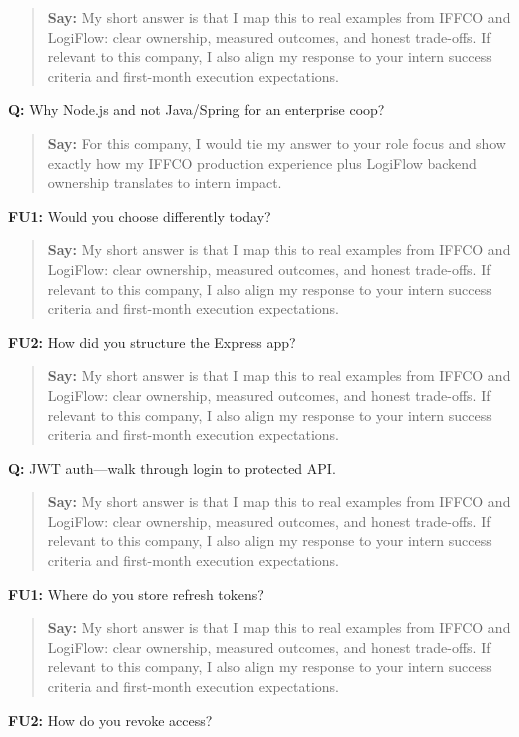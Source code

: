 \documentclass[9pt,a4paper]{article}
\begin{document}
\begin{quote}\small\textbf{Say:} My short answer is that I map this to real examples from IFFCO and LogiFlow: clear ownership, measured outcomes, and honest trade-offs. If relevant to this company, I also align my response to your intern success criteria and first-month execution expectations.\end{quote}
\vspace{2mm}
\textbf{Q:} Why Node.js and not Java/Spring for an enterprise coop?

\begin{quote}\small\textbf{Say:} For this company, I would tie my answer to your role focus and show exactly how my IFFCO production experience plus LogiFlow backend ownership translates to intern impact.\end{quote}
\vspace{2mm}
\textbf{FU1:} Would you choose differently today?

\begin{quote}\small\textbf{Say:} My short answer is that I map this to real examples from IFFCO and LogiFlow: clear ownership, measured outcomes, and honest trade-offs. If relevant to this company, I also align my response to your intern success criteria and first-month execution expectations.\end{quote}
\vspace{2mm}
\textbf{FU2:} How did you structure the Express app?

\begin{quote}\small\textbf{Say:} My short answer is that I map this to real examples from IFFCO and LogiFlow: clear ownership, measured outcomes, and honest trade-offs. If relevant to this company, I also align my response to your intern success criteria and first-month execution expectations.\end{quote}
\vspace{2mm}
\textbf{Q:} JWT auth---walk through login to protected API.

\begin{quote}\small\textbf{Say:} My short answer is that I map this to real examples from IFFCO and LogiFlow: clear ownership, measured outcomes, and honest trade-offs. If relevant to this company, I also align my response to your intern success criteria and first-month execution expectations.\end{quote}
\vspace{2mm}
\textbf{FU1:} Where do you store refresh tokens?

\begin{quote}\small\textbf{Say:} My short answer is that I map this to real examples from IFFCO and LogiFlow: clear ownership, measured outcomes, and honest trade-offs. If relevant to this company, I also align my response to your intern success criteria and first-month execution expectations.\end{quote}
\vspace{2mm}
\textbf{FU2:} How do you revoke access?
\end{document}
